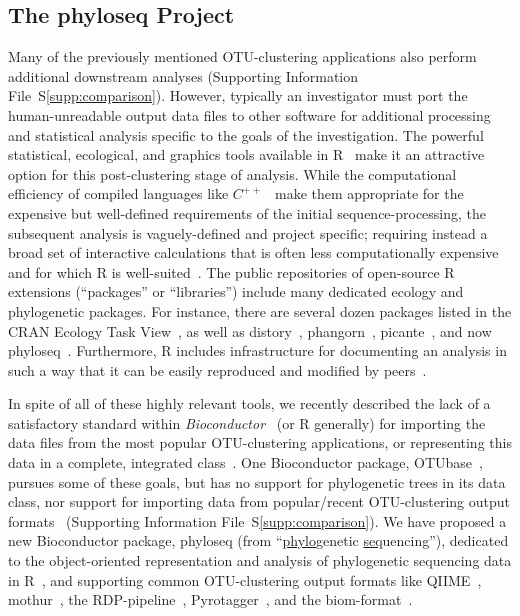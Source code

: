 \documentclass[10pt]{article}\usepackage{graphicx, color}
\newcommand{\R}{{\textsf{R}}}
\begin{document}
\subsection*{The phyloseq Project}
Many of the previously mentioned OTU-clustering applications
also perform additional downstream analyses
(Supporting Information File~S\ref{supp:comparison}).
However, typically an investigator must port
the human-unreadable output data files to other software for 
additional processing and statistical analysis 
specific to the goals of the investigation.
The powerful
statistical,
ecological,
and graphics
tools available in \R{}~\cite{Rlanguage}
make it an attractive option for this post-clustering stage of analysis.
While the computational efficiency of compiled languages like
${C^{++}}$~\cite{cpp}
make them appropriate for the expensive
but well-defined requirements of the initial sequence-processing,
the subsequent analysis is vaguely-defined and project specific;
requiring instead a broad set of interactive calculations
that is often less computationally expensive
and for which \R{} is well-suited~\cite{chambers2008}.
The public repositories of open-source \R{} extensions
(``packages'' or ``libraries'')
include many dedicated ecology and phylogenetic packages. 
For instance, there are several dozen packages listed in the CRAN Ecology Task View~\cite{CRANTV-ecology},
as well as 
distory~\cite{distorypackage}, 
phangorn~\cite{Schliep:2011hh}, 
picante~\cite{Kembel:2010ft}, 
and now phyloseq~\cite{phyloseqPSB}. 
Furthermore, \R{} includes infrastructure
for documenting an analysis in such a way
that it can be easily reproduced and modified by peers~\cite{Sweave,knitr}.

In spite of all of these highly relevant tools, 
we recently described the lack of a satisfactory standard within
\emph{Bioconductor}~\cite{Bioconductor} (or \R{} generally) for 
importing the data files from the most popular OTU-clustering applications,
or representing this data in a complete, integrated class~\cite{phyloseqPSB}.
One Bioconductor package, 
OTUbase~\cite{Beck:2011dc},
pursues some of these goals,
but has no support for phylogenetic trees in its data class,
nor support for importing data from popular/recent
OTU-clustering output formats~\cite{OTUbase-pkg,Beck:2011dc}
(Supporting Information File~S\ref{supp:comparison}).
We have proposed a new Bioconductor package,
phyloseq
(from ``\underline{phylo}genetic \underline{seq}uencing''),
dedicated to the object-oriented representation and analysis of
phylogenetic sequencing data in R~\cite{phyloseqPSB},
and supporting common OTU-clustering output formats like
QIIME~\cite{caporaso2010qiime},
mothur~\cite{mothur},
the RDP-pipeline~\cite{Cole:2009dm},
Pyrotagger~\cite{Kunin:2010wd},
and the biom-format~\cite{McDonald:2012tk}.
\end{document}
